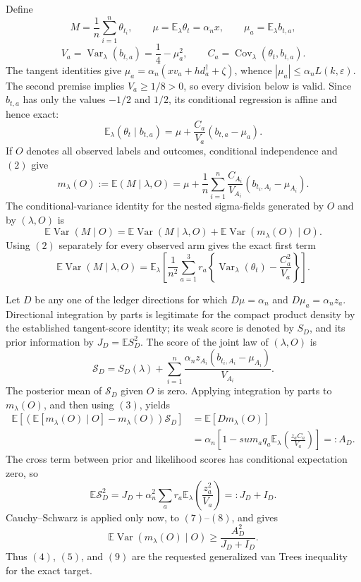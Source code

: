 Define
\[
M=\frac1n\sum_{i=1}^n\theta_{t_i},\qquad
\mu=\mathbb E_\lambda\theta_t=\alpha_nx,\qquad
\mu_a=\mathbb E_\lambda b_{t,a},
\]
\[
V_a=\operatorname{Var}_\lambda(b_{t,a})=\frac14-\mu_a^2,\qquad
C_a=\operatorname{Cov}_\lambda(\theta_t,b_{t,a}).
\tag{1}
\]
The tangent identities give
\(\mu_a=\alpha_n(xv_a+hd_a^\dagger+\zeta)\), whence
\(|\mu_a|\le\alpha_nL(k,\varepsilon)\).  The second premise implies
\(V_a\ge1/8>0\), so every division below is valid.  Since \(b_{t,a}\) has only the values \(-1/2\) and \(1/2\), its conditional regression is affine and hence exact:
\[
\mathbb E_\lambda(\theta_t\mid b_{t,a})
=\mu+\frac{C_a}{V_a}(b_{t,a}-\mu_a).
\tag{2}
\]
If \(O\) denotes all observed labels and outcomes, conditional independence and \((2)\) give
\[
m_\lambda(O):=\mathbb E(M\mid\lambda,O)
=\mu+\frac1n\sum_{i=1}^n
\frac{C_{A_i}}{V_{A_i}}(b_{t_i,A_i}-\mu_{A_i}).
\tag{3}
\]
The conditional-variance identity for the nested sigma-fields generated by \(O\) and by \((\lambda,O)\) is
\[
\mathbb E\operatorname{Var}(M\mid O)
=\mathbb E\operatorname{Var}(M\mid\lambda,O)
+\mathbb E\operatorname{Var}(m_\lambda(O)\mid O).
\tag{4}
\]
Using \((2)\) separately for every observed arm gives the exact first term
\[
\mathbb E\operatorname{Var}(M\mid\lambda,O)
=\mathbb E_\lambda\left[
\frac1{n^2}\sum_{a=1}^3r_a
\left\{\operatorname{Var}_\lambda(\theta_t)-\frac{C_a^2}{V_a}\right\}
\right].
\tag{5}
\]

Let \(D\) be any one of the ledger directions for which
\(D\mu=\alpha_n\) and \(D\mu_a=\alpha_nz_a\).  Directional integration by parts is legitimate for the compact product density by the established tangent-score identity; its weak score is denoted by \(S_D\), and its prior information by \(J_D=\mathbb E S_D^2\).  The score of the joint law of \((\lambda,O)\) is
\[
\mathcal S_D=S_D(\lambda)+
\sum_{i=1}^n
\frac{\alpha_nz_{A_i}(b_{t_i,A_i}-\mu_{A_i})}{V_{A_i}}.
\tag{6}
\]
The posterior mean of \(\mathcal S_D\) given \(O\) is zero.  Applying integration by parts to \(m_\lambda(O)\), and then using \((3)\), yields
\[
\begin{aligned}
\mathbb E[(\mathbb E[m_\lambda(O)\mid O]-m_\lambda(O))\mathcal S_D]
&=\mathbb E[D m_\lambda(O)]\\
&=\alpha_n\left[1-sum_aq_a
\mathbb E_\lambda\left(\frac{z_aC_a}{V_a}\right)\right]
=:A_D.
\end{aligned}
\tag{7}
\]
The cross term between prior and likelihood scores has conditional expectation zero, so
\[
\mathbb E\mathcal S_D^2
=J_D+\alpha_n^2\sum_ar_a
\mathbb E_\lambda\left(\frac{z_a^2}{V_a}\right)=:J_D+I_D.
\tag{8}
\]
Cauchy--Schwarz is applied only now, to \((7)\)--\((8)\), and gives
\[
\mathbb E\operatorname{Var}(m_\lambda(O)\mid O)
\ge\frac{A_D^2}{J_D+I_D}.
\tag{9}
\]
Thus \((4)\), \((5)\), and \((9)\) are the requested generalized van Trees inequality for the exact target.

